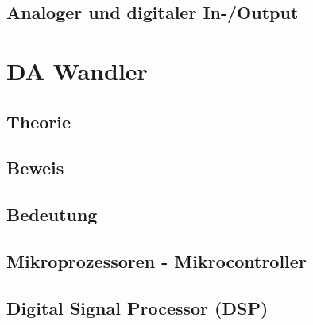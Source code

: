 \documentclass[a4paper,12pt]{article}
\theoremstyle{plain}
\begin{document}
\subsection{Analoger und digitaler In-/Output}\label{3.5}
\newpage
\section{DA Wandler}\label{4}
\newpage
\subsection{Theorie}\label{4.1}
\subsection{Beweis}\label{4.2}
\subsection{Bedeutung}\label{4.3}
\subsection{Mikroprozessoren - Mikrocontroller}\label{4.4}
\subsection{Digital Signal Processor (DSP)}\label{4.5}
\newpage


\end{document}
